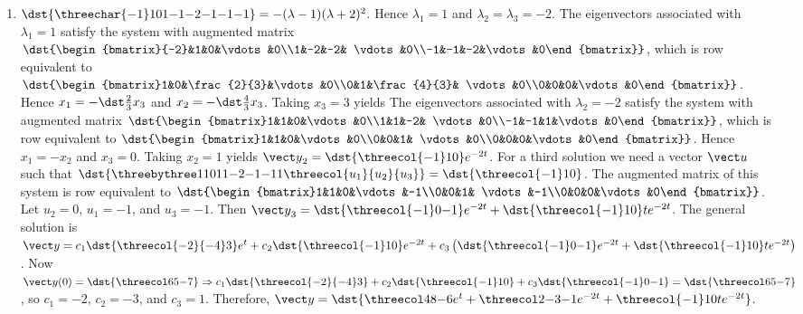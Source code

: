 \documentclass[openany]{book}
\newenvironment{sectionSolutions}{
 \begin{enumerate}[item-label={\thesection.\arabic{enumi}.}]
}{
 \end{enumerate}
}
\begin{document}
\begin{sectionSolutions}
\item
$\dst{\threechar{-1}101{-1}{-2}{-1}{-1}{-1}}
=-(\lambda-1)(\lambda+2)^2$.
Hence $\lambda_1=1$ and  $\lambda_2=\lambda_3=-2$.
The eigenvectors associated
 with $\lambda_1=1$ satisfy the system with  augmented matrix
$\dst{\begin{bmatrix}{-2}&1&0&\vdots&0\\1&-2&-2&
\vdots&0\\-1&-1&-2&\vdots&0\end{bmatrix}}$,
which is row equivalent to
$\dst{\begin{bmatrix}1&0&\frac{2}{3}&\vdots&0\\0&1&\frac{4}{3}&
\vdots&0\\0&0&0&\vdots&0\end{bmatrix}}$.
Hence  $x_1=-\dst\frac{2}{3}x_3$ and $x_2=-\dst\frac{4}{3}x_3$.  Taking
$x_3=3$ yields
The eigenvectors associated
 with $\lambda_2=-2$ satisfy the system with  augmented matrix
$\dst{\begin{bmatrix}1&1&0&\vdots&0\\1&1&-2&
\vdots&0\\-1&-1&1&\vdots&0\end{bmatrix}}$,
which is row equivalent to
$\dst{\begin{bmatrix}1&1&0&\vdots&0\\0&0&1&
\vdots&0\\0&0&0&\vdots&0\end{bmatrix}}$.
Hence  $x_1=-x_2$ and $x_3=0$.  Taking $x_2=1$
yields
${\vect y}_2=\dst{\threecol{-1}10}e^{-2t}$.
For a third solution we need a vector ${\vect u}$ such that
$\dst{\threebythree11011{-2}{-1}{-1}1\threecol{u_1}{u_2}{u_3}}=
\dst{\threecol{-1}10}$.
The augmented matrix of this system is row equivalent to
$\dst{\begin{bmatrix}1&1&0&\vdots&-1\\0&0&1&
\vdots&-1\\0&0&0&\vdots&0\end{bmatrix}}$.
Let $u_2=0$, $u_1=-1$, and $u_3=-1$. Then ${\vect
y}_3=\dst{\threecol{-1}0{-1}}e^{-2t}+\dst{\threecol{-1}10}te^{-2t}$.
The general solution is
${\vect y}=c_1\dst{\threecol{-2}{-4}3}e^t+
c_2\dst{\threecol{-1}10}e^{-2t}
+c_3\left(\dst{\threecol{-1}0{-1}}e^{-2t}+
\dst{\threecol{-1}10}te^{-2t}\right)$.
Now ${\vect y}(0)=\dst{\threecol65{-7}}\Rightarrow
c_1\dst{\threecol{-2}{-4}3}+ c_2\dst{\threecol{-1}10}
+c_3\dst{\threecol{-1}0{-1}}=\dst{\threecol65{-7}}$,
so $c_1=-2$, $c_2=-3$, and $c_3=1$.  Therefore,
${\vect y}=\dst{\threecol48{-6}e^t+\threecol2{-3}{-1}e^{-2t}+
\threecol{-1}10te^{-2t}}$.



\end{sectionSolutions}
\end{document}
